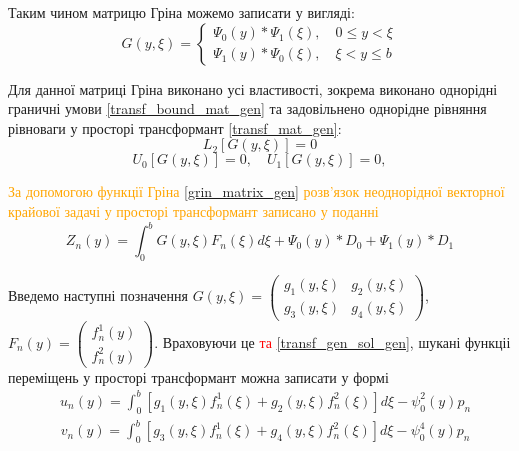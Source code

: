 Таким чином матрицю Гріна можемо записати у вигляді:
\begin{equation}\label{grin_matrix_gen}
    G(y,\xi) = 
    \begin{cases}
        \Psi_0(y) * \Psi_1(\xi), \quad 0 \le y < \xi \\
        \Psi_1(y) * \Psi_0(\xi), \quad \xi < y \le b
    \end{cases}
\end{equation}

Для данної матриці Гріна виконано усі властивості, зокрема виконано однорідні граничні умови \eqref{transf_bound_mat_gen}
та задовільнено однорідне рівняння рівноваги у просторі трансформант \eqref{transf_mat_gen}:
\begin{equation*}
    L_2\left[  G(y, \xi) \right] = 0
\end{equation*}
\begin{equation*}
    U_0\left[ G(y, \xi) \right] = 0, \quad  U_1\left[ G(y, \xi) \right] = 0,
\end{equation*}

\textcolor{orange}
{
За допомогою функції Гріна \eqref{grin_matrix_gen} розв'язок неоднорідної векторної крайової задачі у просторі трансформант записано у поданні \cite{popov_2}
}
\begin{equation}
    Z_n(y) = \int_0^b G(y,\xi) F_n(\xi) d\xi + \Psi_0(y) * D_0 + \Psi_1(y) * D_1
\end{equation}

Введемо наступні позначення $G(y, \xi) = \begin{pmatrix}
    g_1(y,\xi) & g_2(y,\xi) \\
    g_3(y,\xi) & g_4(y,\xi)
\end{pmatrix}$, $F_n(y) = \begin{pmatrix}
    f_n^1(y) \\
    f_n^2(y)
\end{pmatrix}$. Враховуючи це \textcolor{red}{та \eqref{transf_gen_sol_gen}}, шукані функціі переміщень у просторі трансформант можна записати у формі
\begin{align}\label{transf_sol_u_gen}
    &u_n(y) = \int_0^b \left[g_1(y, \xi)f_n^1(\xi) + g_2(y, \xi)f_n^2(\xi) \right]d\xi - \psi_0^2(y) p_n
\end{align}
\begin{align}\label{transf_sol_v_gen}
    &v_n(y) = \int_0^b \left[g_3(y, \xi)f_n^1(\xi) + g_4(y, \xi)f_n^2(\xi) \right]d\xi - \psi_0^4(y) p_n
\end{align}


